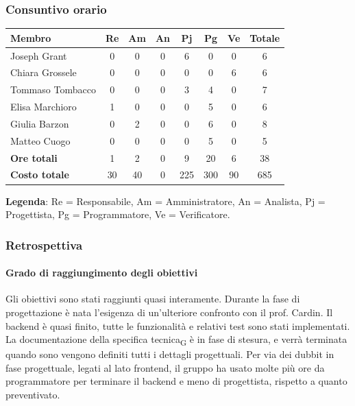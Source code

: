 \documentclass[11pt,a4paper]{article}
\newcommand{\gls}[1]{#1\textsubscript{G}}
\begin{document}
\subsubsection{Consuntivo orario}
\begin{center}
    \begin{tabular}{|l|c|c|c|c|c|c|c|}
        \hline
        \textbf{Membro} & \textbf{Re} & \textbf{Am} & \textbf{An} & \textbf{Pj} & \textbf{Pg} & \textbf{Ve} & \textbf{Totale} \\
        \hline
        Joseph Grant & 0 & 0 & 0 & 6 & 0 & 0 & 6 \\
        \hline
        Chiara Grossele & 0 & 0 & 0 & 0 & 0 & 6 & 6 \\
        \hline
        Tommaso Tombacco & 0 & 0 & 0 & 3 & 4 & 0 & 7 \\
        \hline
        Elisa Marchioro & 1 & 0 & 0 & 0 & 5 & 0 & 6 \\
        \hline
        Giulia Barzon & 0 & 2 & 0 & 0 & 6 & 0 & 8 \\
        \hline
        Matteo Cuogo & 0 & 0 & 0 & 0 & 5 & 0 & 5 \\
        \hline
        \textbf{Ore totali} & 1 & 2 & 0 & 9 & 20 & 6 & 38 \\
        \hline
        \textbf{Costo totale} & 30 & 40 & 0 & 225 & 300 & 90 & 685 \\
        \hline
    \end{tabular}
\end{center}

\noindent \textbf{Legenda}: Re = Responsabile, Am = Amministratore, An = Analista, Pj = Progettista, Pg = Programmatore, Ve = Verificatore.

\subsubsection{Retrospettiva}
\paragraph{Grado di raggiungimento degli obiettivi}
Gli obiettivi sono stati raggiunti quasi interamente. Durante la fase di progettazione è nata l'esigenza di un'ulteriore confronto con il prof. Cardin.
Il backend è quasi finito, tutte le funzionalità e relativi test sono stati implementati.
La documentazione della \gls{specifica tecnica} è in fase di stesura, e verrà terminata quando sono vengono definiti tutti i dettagli progettuali.
Per via dei dubbit in fase progettuale, legati al lato frontend, il gruppo ha usato molte più ore da programmatore per terminare il backend e meno di progettista, rispetto a quanto preventivato.
\end{document}
